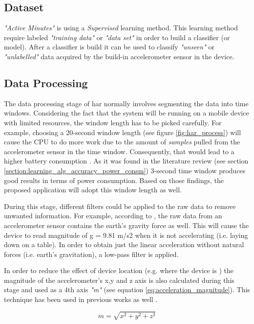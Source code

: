     \subsection{Dataset}
    \textit{"Active Minutes"} is using a \textit{Supervised} learning method. This learning method require labeled \textit{"training data"} or \textit{"data set"} in order to build a classifier (or model). After a classifier is build it can be used to classify \textit{"unseen"} or \textit{"unlabelled"} data acquired by the build-in accelerometer sensor in the device.
    
    
    \subsection{Data Processing}
    The data processing stage of \gls{har} normally involves segmenting the data into time windows. Considering the fact that the system will be running on a mobile device with limited resources, the window length has to be picked carefully. For example, choosing a 20-second window length (see figure \ref{fig:har_process}) will cause the CPU to do more work due to the amount of \textit{samples} pulled from the accelerometer sensor in the time window. Consequently, that would lead to a higher battery consumption \citep[2]{torreshuitzil2015a}. As it was found in the literature review (see section \ref{section:learning_alg_accuracy_power_consm}) 3-second time window produces good results in terms of power consumption. Based on those findings, the proposed application will adopt this window length as well.
    
    During this stage, different filters could be applied to the raw data to remove unwanted information. For example, according to \citet[]{googlemotionsensors}, the raw data from an accelerometer sensor contains the earth's gravity force as well. This will cause the device to read magnitude of g = 9.81 m/s2 when it is not accelerating (i.e. laying down on a table). In order to obtain just the linear acceleration without natural forces (i.e. earth's gravitation), a low-pass filter is applied.
    
    In order to reduce the effect of device location (e.g. where the device is ) the magnitude of the accelerometer's x,y and z axis is also calculated during this stage and used as a 4th axis \textit{"m"} (see equation \ref{eq:acceleration_magnitude}). This technique has been used in previous works as well \citep[153]{torreshuitzil2015b}.
    
    \begin{equation}
        \label{eq:acceleration_magnitude}
        m = \sqrt{x^2 + y^2 + z^2}
    \end{equation}
    
